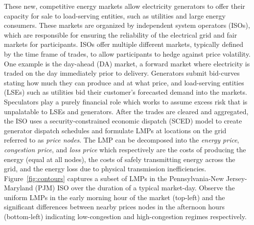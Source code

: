 These new, competitive energy markets allow electricity generators to offer their capacity for sale to load-serving
entities, such as utilities and large energy consumers.
These markets are organized by independent system operators (ISOs), which are responsible for ensuring the reliability
of the electrical grid and fair markets for participants.
ISOs offer multiple different markets, typically defined by the time frame of trades, to allow participants to hedge
against price volatility.
One example is the day-ahead (DA) market, a forward market where electricity is traded on the day immediately prior to
delivery.
Generators submit bid-curves stating how much they can produce and at what price, and load-serving
entities (LSEs) such as utilities bid their customer's forecasted demand into the markets.
Speculators play a purely financial role which works to assume excess risk that is unpalatable to LSEs and generators.
After the trades are cleared and aggregated, the ISO uses a security-constrained economic dispatch (SCED) model to
create generator dispatch schedules and formulate LMPs at locations on the grid referred to as
\textit{price nodes}.
The LMP can be decomposed into the \textit{energy price}, \textit{congestion price}, and \textit{loss price} which
respectively are the costs of producing the energy (equal at all nodes), the costs of safely transmitting energy across
the grid, and the energy loss due to physical transmission inefficiencies.
Figure~\ref{fig:contours} captures a subset of LMPs in the Pennsylvania-New Jersey-Maryland (PJM) ISO over the duration
of a typical market-day.
Observe the uniform LMPs in the early morning hour of the market (top-left) and the significant differences
between nearby prices nodes in the afternoon hours (bottom-left) indicating low-congestion and high-congestion
regimes respectively.

